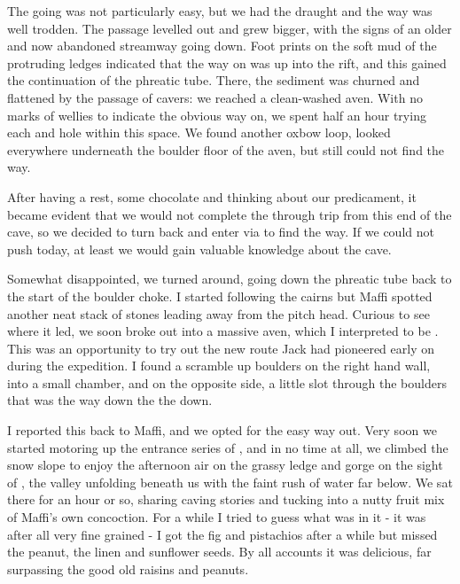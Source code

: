 The going was not particularly easy, but we had the draught and the way was well trodden. The passage levelled out and grew bigger, with the signs of an older and now abandoned streamway going down. Foot prints on the soft mud of the protruding ledges indicated that the way on was up into the rift, and this gained the continuation of the phreatic tube. There, the sediment was churned and flattened by the passage of cavers: we reached a clean-washed aven. With no marks of wellies to indicate the obvious way on, we spent half an hour trying each and hole within this space. We found another oxbow loop, looked everywhere underneath the boulder floor of the aven, but still could not find the way. 

After having a rest, some chocolate and thinking about our predicament, it became evident that we would not complete the through trip from this end of the cave, so we decided to turn back and enter via  to find the way. If we could not push today, at least we would gain valuable knowledge about the cave. 

Somewhat disappointed, we turned around, going down the phreatic tube back to the start of the boulder choke. I started following the cairns but Maffi spotted another neat stack of stones leading away from the pitch head. Curious to see where it led, we soon broke out into a massive aven, which I interpreted to be . This was an opportunity to try out the new route Jack had pioneered early on during the expedition. I found a scramble up boulders on the right hand wall, into a small chamber, and on the opposite side, a little slot through the boulders that was the way down the the  down. 

I reported this back to Maffi, and we opted for the easy way out. Very soon we started motoring up the entrance series of , and in no time at all, we climbed the snow slope to enjoy the afternoon air on the grassy ledge and gorge on the sight of , the  valley unfolding beneath us with the faint rush of water far below. We sat there for an hour or so, sharing caving stories and tucking into a nutty fruit mix of Maffi’s own concoction. For a while I tried to guess what was in it - it was after all very fine grained - I got the fig and pistachios after a while but missed the peanut, the linen and sunflower seeds. By all accounts it was delicious, far surpassing the good old raisins and peanuts. 

